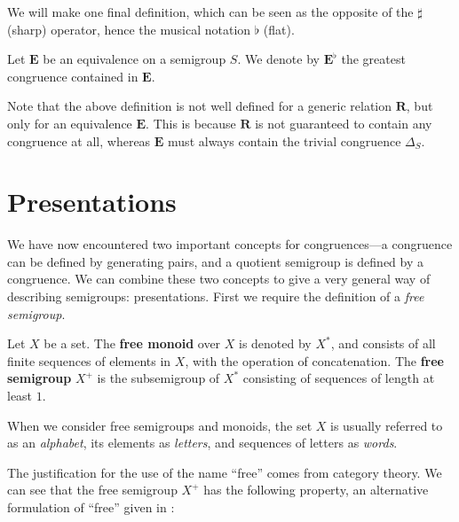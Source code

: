 We will make one final definition, which can be seen as the opposite of the
$\sharp$ (sharp) operator, hence the musical notation $\flat$ (flat).

\begin{definition}
  \label{def:e-flat}
  Let $\mathbf{E}$ be an equivalence on a semigroup $S$.  We denote by
  $\mathbf{E}^\flat$ the greatest congruence contained in $\mathbf{E}$.
\end{definition}

Note that the above definition is not well defined for a generic relation
$\mathbf{R}$, but only for an equivalence $\mathbf{E}$.  This is because
$\mathbf{R}$ is not guaranteed to contain any congruence at all, whereas
$\mathbf{E}$ must always contain the trivial congruence $\Delta_S$.

\section{Presentations}
\label{sec:intro-presentations}

We have now encountered two important concepts for congruences---a congruence
can be defined by generating pairs, and a quotient semigroup is defined by a
congruence.  We can combine these two concepts to give a very general way of
describing semigroups: presentations.  First we require the definition of a
\textit{free semigroup}.

\begin{definition}
  \label{def:free}
  Let $X$ be a set.  The \textbf{free monoid} over $X$ is denoted by $X^*$, and
  consists of all finite sequences of elements in $X$, with the operation of
  concatenation.  The \textbf{free semigroup} $X^+$ is the subsemigroup of $X^*$
  consisting of sequences of length at least $1$.
\end{definition}

When we consider free semigroups and monoids, the set $X$ is usually referred to
as an \textit{alphabet}, its elements as \textit{letters}, and sequences of
letters as \textit{words}.

The justification for the use of the name ``free'' comes from category theory.
We can see that the free semigroup $X^+$ has the following property, an
alternative formulation of ``free'' given in \cite[\S 1.6]{howie}:

